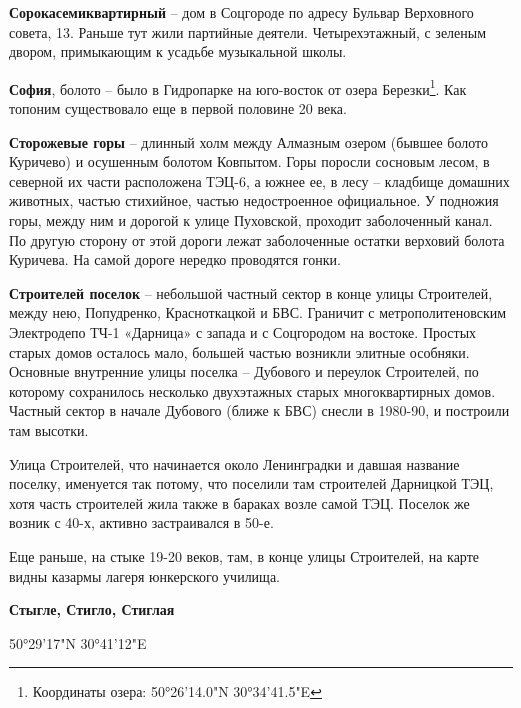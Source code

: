 \medskip




\textbf{Сорокасемиквартирный} – дом в Соцгороде по адресу Бульвар Верховного совета, 13. Раньше тут жили партийные деятели. Четырехэтажный, с зеленым двором, примыкающим к усадьбе музыкальной школы.\\

\medskip


\textbf{София}, болото – было в Гидропарке на юго-восток от озера Березки\footnote{Координаты озера: 50°26'14.0"N 30°34'41.5"E}. Как топоним существовало еще в первой половине 20 века.\\

\medskip

 
\textbf{Сторожевые горы} – длинный холм между Алмазным озером (бывшее болото Куричево) и осушенным болотом Ковпытом. Горы поросли сосновым лесом, в северной их части расположена ТЭЦ-6, а южнее ее, в лесу – кладбище домашних животных, частью стихийное, частью недостроенное официальное. У подножия горы, между ним и дорогой к улице Пуховской, проходит заболоченный канал. По другую сторону от этой дороги лежат заболоченные остатки верховий болота Куричева. На самой дороге нередко проводятся гонки.\\

\medskip

\textbf{Строителей поселок} – небольшой частный сектор в конце улицы Строителей, между нею, Попудренко, Красноткацкой и БВС. Граничит с метрополитеновским Электродепо ТЧ-1 «Дарница» с запада и с Соцгородом на востоке. Простых старых домов осталось мало, большей частью возникли элитные особняки. Основные внутренние улицы поселка – Дубового и переулок Строителей, по которому сохранилось несколько двухэтажных старых многоквартирных домов. Частный сектор в начале Дубового (ближе к БВС) снесли в 1980-90, и построили там высотки.

Улица Строителей, что начинается около Ленинградки и давшая название поселку, именуется так потому, что поселили там строителей Дарницкой ТЭЦ, хотя часть строителей жила также в бараках возле самой ТЭЦ. Поселок же возник с 40-х, активно застраивался в 50-е.

Еще раньше, на стыке 19-20 веков, там, в конце улицы Строителей, на карте видны казармы лагеря юнкерского училища.\\

\medskip

\textbf{Стыгле, Стигло, Стиглая}

50°29'17"N 30°41'12"E

